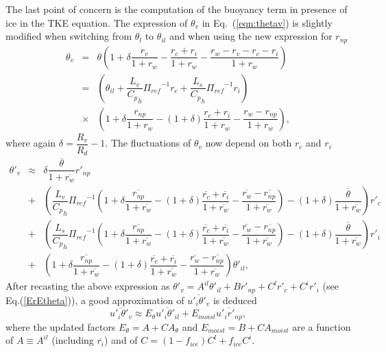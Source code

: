 The last point of concern is the computation of the buoyancy term in presence of
ice in the TKE equation. The expression of $\theta_{v}$ in Eq.~(\ref{eqn:thetav}) is
slightly modified when switching from $\theta_l$ to $\theta_{il}$ and when
using the new expression for $r_{np}$
\begin{eqnarray}\label{eqn:newthetav}
\theta_{v} &=& \theta (1+\delta\dfrac{r_{v}}{1+r_{w}}-
\dfrac{r_{c}+r_{i}}{1+r_{w}}-\dfrac{r_{w}-r_{v}-r_{c}-r_{i}}{1+r_{w}}) 
\nonumber\\
&=& \left( \theta_{il}+\dfrac{L_{v}}{{C_{p}}_{h}}{{\Pi}_{ref}}^{-1}r_{c}
                      +\dfrac{L_{s}}{{C_{p}}_{h}}{{\Pi}_{ref}}^{-1}r_{i} \right)
\nonumber\\
&\times& \left( 1+ \delta \dfrac{r_{np}}{1+r_{w}}-
(1+\delta)\dfrac{r_{c}+r_{i}}{1+r_{w}}-\dfrac{r_{w}-r_{np}}{1+r_{w}} \right),
\end{eqnarray}
where again $\delta = \dfrac{R_{v}}{R_{d}}-1$.
The fluctuations of $\theta_v$ now depend on both ${r_{c}}$ and ${r_{i}}$
\begin{eqnarray}\label{eqn:newtheta'v}
{\theta}'_{v} &\approx&
\delta \dfrac {\overline{\theta}}{1+\overline{r_{w}}} {r'_{np}}\nonumber\\
&+& \left(\dfrac{L_{v}}{{C_{p}}_{h}}{{\Pi}_{ref}}^{-1}
\left( 1+\delta \dfrac{\overline{r_{np}}}{1+\overline{r_{w}}}-
(1+\delta)\dfrac{\overline{r_{c}}+\overline{r_{i}}}{1+\overline{r_{w}}}-
\dfrac{\overline{r_{w}}-\overline{r_{np}}}{1+\overline{r_{w}}}\right)-(1+\delta)
\dfrac{\overline{\theta}}{1+\overline{r_{w}}}\right) {r'_{c}}\nonumber\\
&+& \left(\dfrac{L_{s}}{{C_{p}}_{h}}{{\Pi}_{ref}}^{-1}
\left( 1+\delta \dfrac{\overline{r_{np}}}{1+\overline{r_{w}}}-
(1+\delta)\dfrac{\overline{r_{c}}+\overline{r_{i}}}{1+\overline{r_{w}}}-
\dfrac{\overline{r_{w}}-\overline{r_{np}}}{1+\overline{r_{w}}}\right)-(1+\delta)
\dfrac{\overline{\theta}}{1+\overline{r_{w}}}\right) {r'_{i}}\nonumber\\
&+& \left(1+\delta \dfrac{\overline{r_{np}}}{1+\overline{r_{w}}} -
(1+\delta)\dfrac{\overline{r_{c}}+\overline{r_{i}}}{1+\overline{r_{w}}}
-\dfrac{\overline{r_{w}}-\overline{r_{np}}}{1+\overline{r_{w}}}\right)
{\theta}'_{il},
\end{eqnarray}
After recasting the above expression as
${\theta}'_{v}=A^{il}{\theta}'_{il}+B{r'_{np}}+C^l{r'_{c}}+C^i{r'_{i}}$
(see Eq.(\ref{ErEtheta})), a good approximation of $\overline{u'_{i}\theta'_{v}}$ 
is deduced
\begin{equation} \label{newErEtheta}
\overline{{u'_{i}}{{\theta}'_{v}}} \approx 
E_{\theta} \overline{u'_{i}\theta'_{il}} +
E_{moist}  \overline{u'_{i}r'_{np}},
\end{equation}
where the updated factors $E_{\theta} = A + C A_{\theta}$ and 
$E_{moist} = B + C A_{moist}$ are a function of $A \equiv A^{il}$ (including
$\overline{r_{i}}$) and of $C=(1-f_{ice}) C^l + f_{ice} C^i$.

